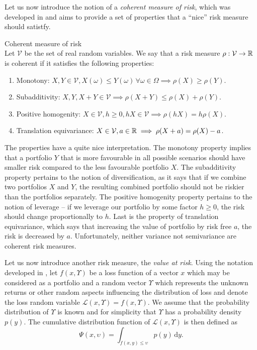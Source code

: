 Let us now introduce the notion of a \textit{coherent measure of risk}, which was developed in \cite[Defintion 2.4.]{coherent_measures_of_risk} and aims to provide a set of properties that a “nice” risk measure should satistfy.
\begin{defn}{Coherent measure of risk} \\
Let $\mathcal{V}$ be the set of real random variables. We say that a risk measure $\rho: \mathcal{V} \rightarrow \mathbb{R}$ is coherent if it satisfies the following properties:
\begin{enumerate}
	\item Monotony: $X, Y \in \mathcal{V}, X(\omega) \leq Y(\omega) \, \forall \omega \in \Omega \implies \rho(X) \geq \rho(Y)$.
	\item Subadditivity: $X, Y, X+Y \in \mathcal{V} \implies \rho(X+	Y) \leq \rho(X) + \rho(Y)$.
	\item Positive homogenity: $X \in \mathcal{V}, h \geq 0, hX \in \mathcal{V} \implies \rho(hX)=h\rho(X)$.
	\item Translation equivariance: $X \in \mathcal{V}, a \in \mathbb{R} \implies \rho(X+a)=\rho(X)-a$.
\end{enumerate}
\end{defn}
The properties have a quite nice interpretation. The monotony property implies that a portfolio $Y$ that is more favourable in all possible scenarios should have smaller risk compared to the less favourable portfolio $X$. The subadditivity property pertains to the notion of diversification, as it says that if we combine two portfolios $X$ and $Y$, the resulting combined portfolio should not be riskier than the portfolios separately. The positive homogenity property pertains to the notion of leverage -- if we leverage our portfolio by some factor $h\geq0$, the risk should change proportionally to $h$. Last is the property of translation equivariance, which says that increasing the value of portfolio by risk free $a$, the risk is decreased by $a$.  Unfortunately, neither variance not semivariance are coherent risk measures.

Let us now introduce another risk measure, the \textit{value at risk}.
Using the notation developed in \cite{cornuejols_tutuncu_2006}, let $f(x,\Upsilon)$ be a loss function of a vector $x$ which may be considered as a portfolio and a random vector $\Upsilon$ which represents the unknown returns or other random aspects influencing the distribution of loss and denote the loss random variable $\mathcal{L}(x,\Upsilon)=f(x,\Upsilon)$. We assume that the probability distribution of $\Upsilon$ is known and for simplicity that $\Upsilon$ has a probability density $p(y)$. The cumulative distribution function of $\mathcal{L}(x,\Upsilon)$ is then defined as
\begin{equation*}
\Psi(x,\upsilon)=\int_{f(x,y) \leq \upsilon} p(y) \, \mathrm{d}y.
\end{equation*}

